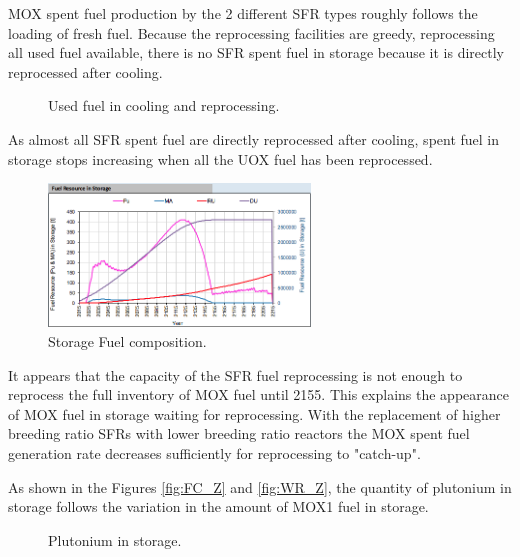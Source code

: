 \documentclass[12pt]{article}
\begin{document}
MOX spent fuel production by the 2 different SFR types roughly follows the
loading of fresh fuel.  Because the reprocessing facilities are greedy,
reprocessing all used fuel available, there is no SFR spent fuel in storage
because it is directly reprocessed after cooling.

\begin{figure}[h!]
    \centering
    \caption{Used fuel in cooling and reprocessing.\label{fig:cool_reprocc} }
\end{figure}

As almost all SFR spent fuel are directly reprocessed after cooling, spent
fuel in storage stops increasing when all the UOX fuel has been reprocessed.

\begin{figure}[h!]
    \centering
    \includegraphics[width=0.62\textwidth]{img/FuelInStorage_1}
    \caption{Storage Fuel composition.}
    \label{fig:storagecompo_1}
\end{figure}

It appears that the capacity of the SFR fuel reprocessing is not enough to
reprocess the full inventory of MOX fuel until 2155. This explains the
appearance of MOX fuel in storage waiting for reprocessing. With the
replacement of higher breeding ratio SFRs with lower breeding ratio reactors
the MOX spent fuel generation rate decreases sufficiently for reprocessing to
"catch-up".

As shown in the Figures \ref{fig:FC_Z} and \ref{fig:WR_Z}, the quantity of
plutonium in storage follows the variation in the amount of MOX1 fuel in
storage.

\begin{figure}[h!]
    \centering
    \caption{Plutonium in storage.\label{fig:FC_WR_zoom} }
\end{figure}
\end{document}
